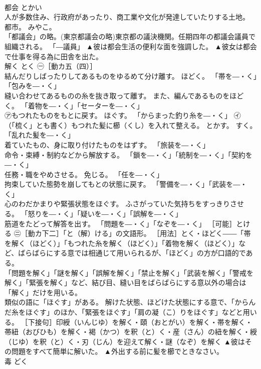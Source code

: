 \documentclass[8pt]{extreport}
\begin{document}
\begin{CJK}{UTF8}{min}
\\	都会	とかい	
\\	人が多数住み、行政府があったり、商工業や文化が発達していたりする土地。 都市。 みやこ。 
\\	「都議会」の略。(東京都議会の略)東京都の議決機関。任期四年の都議会議員で組織される。 「―議員」	▲彼は都会生活の便利な面を強調した。 ▲彼女は都会で仕事を得る為に田舎を出た。
\\	解く	とく	㊀［動カ五（四）］ 
\\	結んだりしばったりしてあるものをゆるめて分け離す。 ほどく。 「帯を―・く」「包みを―・く」 
\\	縫い合わせてあるものの糸を抜き取って離す。 また、編んであるものをほどく。 「着物を―・く」「セーターを―・く」 
\\	㋐もつれたものをもとに戻す。 ほぐす。 「からまった釣り糸を―・く」 ㋑（「梳く」とも書く）もつれた髪に櫛（くし）を入れて整える。 とかす。 すく。 「乱れた髪を―・く」 
\\	着ていたもの、身に取り付けたものをはずす。 「旅装を―・く」 
\\	命令・束縛・制約などから解放する。 「鎖を―・く」「統制を―・く」「契約を―・く」 
\\	任務・職をやめさせる。 免じる。 「任を―・く」 
\\	拘束していた態勢を崩してもとの状態に戻す。 「警備を―・く」「武装を―・く」 
\\	心のわだかまりや緊張状態をほぐす。 ふさがっていた気持ちをすっきりさせる。 「怒りを―・く」「疑いを―・く」「誤解を―・く」 
\\	筋道をたどって解答を出す。 「問題を―・く」「なぞを―・く」 ［可能］とける ㊁［動カ下二］「と（解）ける」の文語形。 ［用法］とく・ほどく――「帯を解く（ほどく）」「もつれた糸を解く（ほどく）」「着物を解く（ほどく）」など、ばらばらにする意では相通じて用いられるが、「ほどく」の方が口語的である。 
\\	「問題を解く」「謎を解く」「誤解を解く」「禁止を解く」「武装を解く」「警戒を解く」「緊張を解く」など、結び目、縫い目をばらばらにする意以外の場合は「解く」だけを用いる。 
\\	類似の語に「ほぐす」がある。 解けた状態、ほどけた状態にする意で、「からんだ糸をほぐす」のほか、「緊張をほぐす」「肩の凝（こ）りをほぐす」などと用いる。 ［下接句］印綬（いんじゆ）を解く・頤（おとがい）を解く・帯を解く・帯紐（おびひも）を解く・褐（かつ）を釈（と）く・産（さん）の紐を解く・綬（じゆ）を釈（と）く・刃（じん）を迎えて解く・謎（なぞ）を解く	▲彼はその問題をすべて簡単に解いた。 ▲外出する前に髪を櫛でときなさい。
\\	毒	どく	

\end{CJK}
\end{document}
